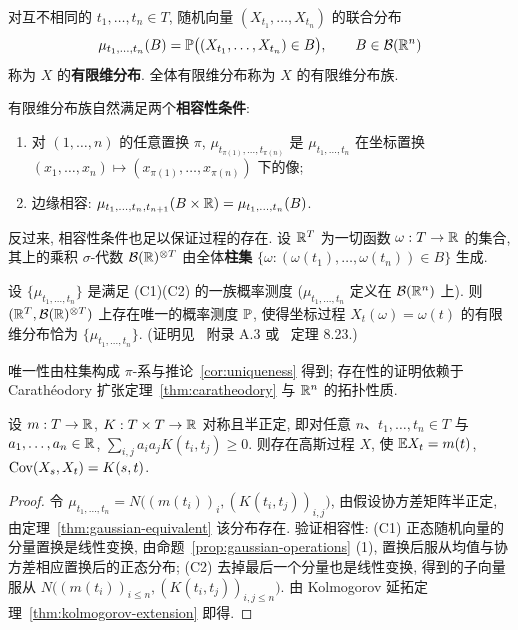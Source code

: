 \begin{definition}[有限维分布]\label{def:fdd}
对互不相同的 $t_1,\dots,t_n\in T$, 随机向量 $(X_{t_1},\dots,X_{t_n})$ 的联合分布
\[
\mu_{t_1,\dots,t_n}(B)=\P\big((X_{t_1},\dots,X_{t_n})\in B\big),\qquad B\in\mathcal{B}(\R^n)
\]
称为 $X$ 的\textbf{有限维分布}. 全体有限维分布称为 $X$ 的有限维分布族.
\end{definition}

有限维分布族自然满足两个\textbf{相容性条件}:
\begin{enumerate}
\item[(C1)] 对 $(1,\dots,n)$ 的任意置换 $\pi$, $\mu_{t_{\pi(1)},\dots,t_{\pi(n)}}$ 是 $\mu_{t_1,\dots,t_n}$ 在坐标置换 $(x_1,\dots,x_n)\mapsto(x_{\pi(1)},\dots,x_{\pi(n)})$ 下的像;
\item[(C2)] 边缘相容: $\mu_{t_1,\dots,t_n,t_{n+1}}(B\times\R)=\mu_{t_1,\dots,t_n}(B)$.
\end{enumerate}
反过来, 相容性条件也足以保证过程的存在. 设 $\R^T$ 为一切函数 $\omega:T\to\R$ 的集合, 其上的乘积 $\sigma$-代数 $\mathcal{B}(\R)^{\otimes T}$ 由全体\textbf{柱集} $\{\omega: (\omega(t_1),\dots,\omega(t_n))\in B\}$ 生成.

\begin{theorem}\label{thm:kolmogorov-extension}
设 $\{\mu_{t_1,\dots,t_n}\}$ 是满足 (C1)(C2) 的一族概率测度 ($\mu_{t_1,\dots,t_n}$ 定义在 $\mathcal{B}(\R^n)$ 上). 则 $(\R^T,\mathcal{B}(\R)^{\otimes T})$ 上存在唯一的概率测度 $\P$, 使得坐标过程 $X_t(\omega)=\omega(t)$ 的有限维分布恰为 $\{\mu_{t_1,\dots,t_n}\}$. (证明见~\cite{durrett} 附录 A.3 或~\cite{kallenberg} 定理 8.23.)
\end{theorem}

唯一性由柱集构成 $\pi$-系与推论~\ref{cor:uniqueness} 得到; 存在性的证明依赖于 Carath\'eodory 扩张定理~\ref{thm:caratheodory} 与 $\R^n$ 的拓扑性质.

\begin{corollary}[高斯过程的存在性]\label{cor:gaussian-process}
设 $m:T\to\R$, $K:T\times T\to\R$ 对称且半正定, 即对任意 $n$、$t_1,\dots,t_n\in T$ 与 $a_1,\dots,a_n\in\R$, $\sum_{i,j}a_ia_jK(t_i,t_j)\ge0$. 则存在高斯过程 $X$, 使 $\E X_t=m(t)$, $\Cov(X_s,X_t)=K(s,t)$.
\end{corollary}

\begin{proof}
令 $\mu_{t_1,\dots,t_n}=N\big((m(t_i))_i,(K(t_i,t_j))_{i,j}\big)$, 由假设协方差矩阵半正定, 由定理~\ref{thm:gaussian-equivalent} 该分布存在. 验证相容性: (C1) 正态随机向量的分量置换是线性变换, 由命题~\ref{prop:gaussian-operations} (1), 置换后服从均值与协方差相应置换后的正态分布; (C2) 去掉最后一个分量也是线性变换, 得到的子向量服从 $N\big((m(t_i))_{i\le n},(K(t_i,t_j))_{i,j\le n}\big)$. 由 Kolmogorov 延拓定理~\ref{thm:kolmogorov-extension} 即得.
\end{proof}

